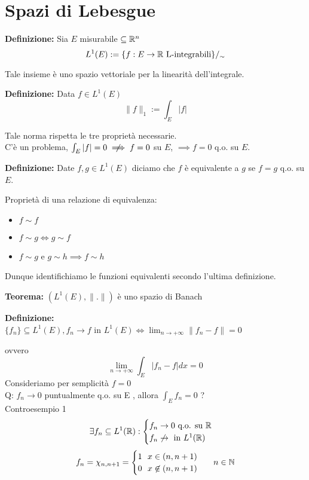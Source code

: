 
\section{Spazi di Lebesgue}
\begin{tcolorbox}
	\textbf{Definizione: }Sia  $E$  misurabile  $\subseteq\mathbb{R}^n$ 
	  \[L^1(E):= \{f:E\to  \mathbb{R}\     \text{L-integrabili} \} /_{\sim}\]  
\end{tcolorbox}
Tale insieme è uno spazio vettoriale per la linearità dell'integrale.
\begin{tcolorbox}
	\textbf{Definizione: }Data  $f \in  L ^1(E)$ 
  \[\|f\|_1:=\int_{E}^{} |f|\]  
\end{tcolorbox}
Tale norma rispetta le tre proprietà necessarie.
\\C'è un problema,  $\int_{E}^{} |f|=0\centernot\implies f=0$  su $E$,  $\implies f=0$  q.o. su  $E$.
\begin{tcolorbox}
	\textbf{Definizione: }Date  $f,g\in  L ^1(E)$  diciamo che  $f$  è equivalente a  $g$  se  $f=g$  q.o. su  $E$.
\end{tcolorbox}
Proprietà di una relazione di equivalenza:
\begin{itemize}
	\item $f\sim f$ 
	\item $f\sim g \iff g\sim f$ 
	\item $ f\sim g$ e $g\sim h\implies f\sim h$ 
\end{itemize}
Dunque identifichiamo le funzioni equivalenti secondo l'ultima definizione.
\begin{tcolorbox}
	\textbf{Teorema: }$(L^1(E),\|.\|)$  è uno spazio di Banach
\end{tcolorbox}
\begin{tcolorbox}
	\textbf{Definizione: }\\$\{f_n\} \subseteq L^1(E),f_n\to f$ in $L^1(E) \iff \lim_{n \to +\infty} \|f_n-f\|=0$ 
\end{tcolorbox}
ovvero
\[\lim_{n\to +\infty} \int_{E}^{} |f_n-f|dx=0\] 
Consideriamo per semplicità  $f=0$ 
\\Q: $f_n\to  0$  puntualmente q.o. su  E , allora  $\int_{E}^{} f_n=0$ ? 
\\Controesempio 1
\[\exists f_n\subseteq  L^1(\mathbb{R}): \begin{cases}
	f_n\to 0\text{ q.o. su } \mathbb{R}\\
	f_n \not\to \text{ in }L^1(\mathbb{R})
\end{cases}
\]
\[f_n=\chi_{n, n+1}=\begin{cases}
	1\ \ x\in(n,n+1)
	\\0\ \ x \not\in (n,n+1)
\end{cases}\ \ n\in \mathbb{N}
\]
